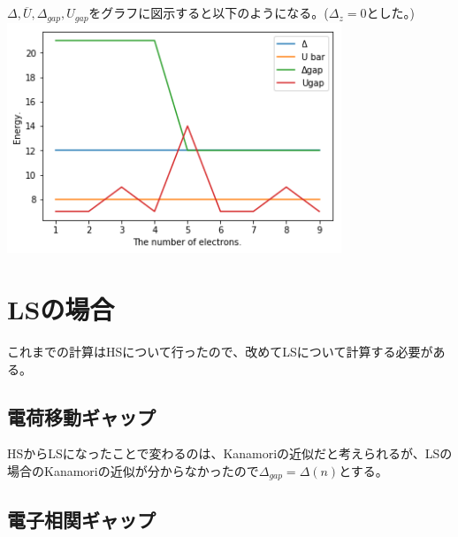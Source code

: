 \documentclass{jsarticle}
\begin{document}
\newpage

\subsection{}
$\Delta, \overline{U}, \Delta_{gap}, U_{gap}$をグラフに図示すると以下のようになる。($\Delta _z = 0$とした。) \\
\includegraphics[width=10cm]{graph01.png}

\section{LSの場合}
これまでの計算はHSについて行ったので、改めてLSについて計算する必要がある。
\subsection{電荷移動ギャップ}
HSからLSになったことで変わるのは、Kanamoriの近似だと考えられるが、LSの場合のKanamoriの近似が分からなかったので$\Delta _{gap} = \Delta(n)$とする。

\subsection{電子相関ギャップ}
\end{document}
